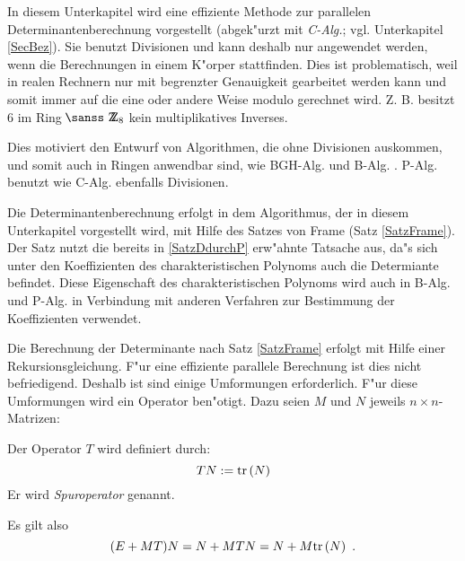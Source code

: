 In diesem Unterkapitel wird eine effiziente Methode zur parallelen
Determinantenberechnung \cite{Csan76} vorgestellt (abgek"urzt mit 
{\em C-Alg.};
vgl. Unterkapitel \ref{SecBez}). Sie benutzt Divisionen und kann deshalb
nur angewendet werden, wenn die Berechnungen in einem K"orper stattfinden.
Dies ist problematisch,
weil in realen Rechnern nur mit begrenzter Genauigkeit gearbeitet werden 
kann und somit immer auf die eine oder andere Weise modulo gerechnet wird. 
Z. B. besitzt 6 im Ring $ \Integers_8 $ kein multiplikatives Inverses.

Dies motiviert den Entwurf von Algorithmen, die ohne Divisionen
auskommen, und somit auch in Ringen anwendbar sind, wie BGH-Alg. und
B-Alg. . P-Alg. benutzt wie C-Alg. ebenfalls Divisionen.

Die Determinantenberechnung erfolgt in dem Algorithmus, der in diesem
Unterkapitel vorgestellt wird, mit Hilfe des Satzes von Frame
(Satz \ref{SatzFrame}). Der Satz nutzt die bereits in \ref{SatzDdurchP}
erw"ahnte Tatsache aus, da"s sich unter den Koeffizienten des
charakteristischen Polynoms auch die Determiante befindet. Diese Eigenschaft
des charakteristischen Polynoms wird auch in B-Alg. und P-Alg. in
Verbindung mit anderen Verfahren zur Bestimmung der Koeffizienten
verwendet.

Die Berechnung der Determinante nach Satz \ref{SatzFrame} erfolgt mit Hilfe
einer Rekursionsgleichung. F"ur eine effiziente parallele Berechnung ist
dies nicht befriedigend. Deshalb ist sind einige Umformungen \cite{Csan76}
erforderlich. F"ur diese Umformungen wird ein Operator ben"otigt. Dazu seien
$M$ und $N$ jeweils $n \times n$-Matrizen:

\MyBeginDef
{}
\label{DefSpurOp}
    Der Operator $T$ wird definiert durch: \[ {T}{N} := \mbox{\rm tr} \,(N) \]
    Er wird {\em Spuroperator} genannt.
\MyEndDef

Es gilt also \[ (E + MT)N = N + {M}{T}{N} = N + M \mbox{\rm tr} \,(N) \mbox{\hspace{0.5em}.} \]

